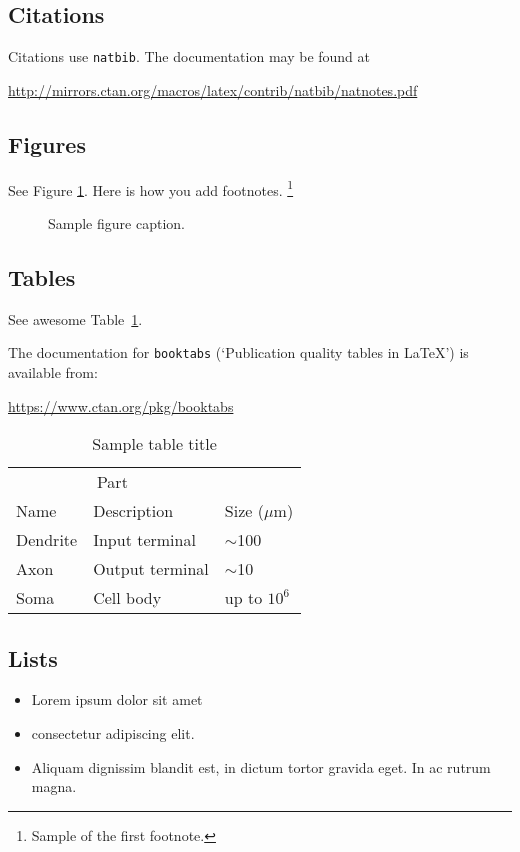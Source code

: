 \documentclass{article}
\begin{document}
\subsection{Citations}
Citations use \verb+natbib+. The documentation may be found at
\begin{center}
	\url{http://mirrors.ctan.org/macros/latex/contrib/natbib/natnotes.pdf}
\end{center}

\subsection{Figures}
\lipsum[10]
See Figure \ref{fig:fig1}. Here is how you add footnotes. \footnote{Sample of the first footnote.}
\lipsum[11]

\begin{figure}
	\centering
	\caption{Sample figure caption.}
	\label{fig:fig1}
\end{figure}

\subsection{Tables}
See awesome Table~\ref{tab:table}.

The documentation for \verb+booktabs+ (`Publication quality tables in LaTeX') is available from:
\begin{center}
	\url{https://www.ctan.org/pkg/booktabs}
\end{center}


\begin{table}
	\caption{Sample table title}
	\centering
	\begin{tabular}{lll}
		\toprule
		\multicolumn{2}{c}{Part}                   \\
		\cmidrule(r){1-2}
		Name     & Description     & Size ($\mu$m) \\
		\midrule
		Dendrite & Input terminal  & $\sim$100     \\
		Axon     & Output terminal & $\sim$10      \\
		Soma     & Cell body       & up to $10^6$  \\
		\bottomrule
	\end{tabular}
	\label{tab:table}
\end{table}

\subsection{Lists}
\begin{itemize}
	\item Lorem ipsum dolor sit amet
	\item consectetur adipiscing elit.
	\item Aliquam dignissim blandit est, in dictum tortor gravida eget. In ac rutrum magna.
\end{itemize}


\end{document}
